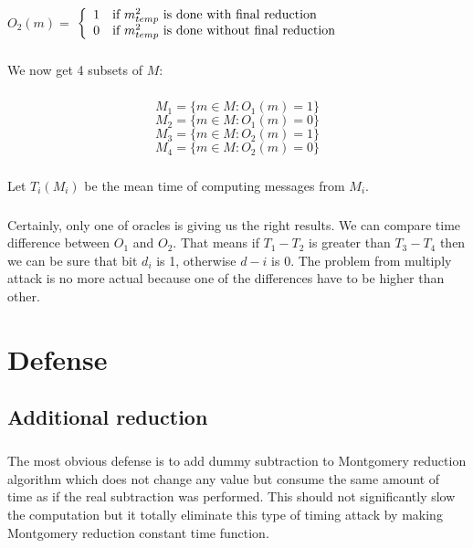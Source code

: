 \documentclass[thesis=B,english]{FITthesis}[2012/10/20]
\begin{document}
{{\paragraph*{}
\( O_2(m) =\) $\left\{
  \begin{array}{cl}
    \text{1} & \text{\mbox{if}  \(m_{temp}^2\) is done with final reduction} \\
    \text{0} & \text{\mbox{if}  \(m_{temp}^2\) is done without final reduction} 
  \end{array}
\right.$

\paragraph*{}{
We now get 4 subsets of \(M\):
}
\paragraph*{}
\[M_1 = \{m \in M : O_1(m) = 1\}\]
\[M_2 = \{m \in M : O_1(m) = 0\}\]
\[M_3 = \{m \in M : O_2(m) = 1\}\]
\[M_4 = \{m \in M : O_2(m) = 0\}\]

\paragraph*{}
{Let \(T_i(M_i)\) be the mean time of computing messages from \(M_i\). }


\paragraph*{}{
Certainly, only one of oracles is giving us the right results. We can compare time difference between \( O_1 \) and \(O_2\). That means if \(T_1 - T_2 \) is greater than 
\(T_3 - T_4\) then we can be sure that bit \(d_i\) is 1, otherwise \(d-i\) is 0. The problem from multiply attack is no more actual because one of the differences have to be higher
than other.
}\cite{Dhem}\cite{mi-kry}


\chapter{Defense}
\section{Additional reduction}
\paragraph*{}{
The most obvious defense is to add dummy subtraction to Montgomery reduction algorithm which does not change any value but consume the same amount of time as if the real subtraction
was performed. This should not significantly slow the computation but it totally eliminate this type of timing attack by making Montgomery reduction constant time function.
}

}}
\end{document}
